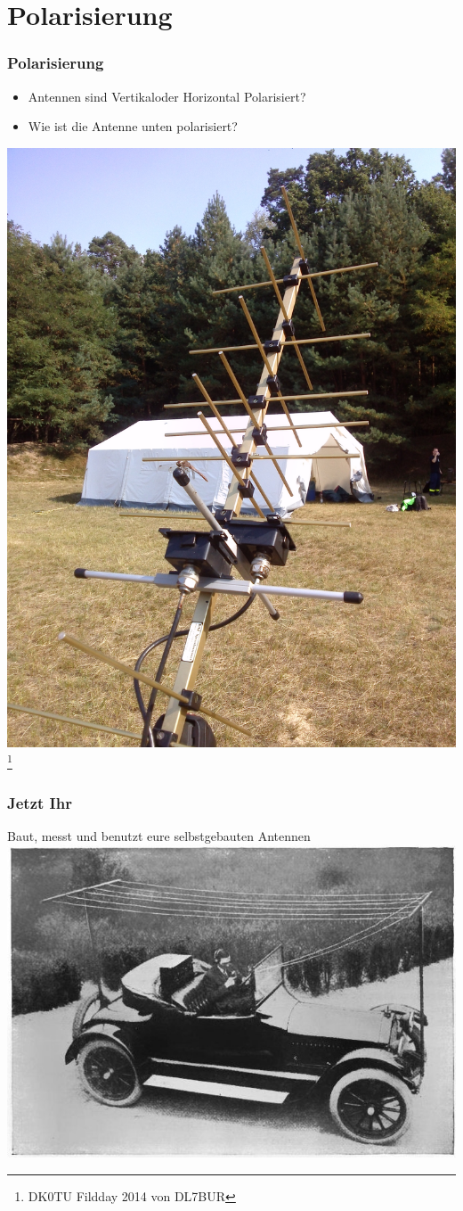 \section*{Polarisierung}

\begin{frame}
    \frametitle{Polarisierung}
    	\begin{itemize}
		\item Antennen sind Vertikaloder Horizontal Polarisiert?
		\item Wie ist die Antenne unten polarisiert?
    \end{itemize}
    \begin{center}
        \includegraphics[width=.4\textwidth]{e11/kreutzYagi.jpg}
        \footnote{\tiny DK0TU Fildday 2014 von DL7BUR}
	\end{center}
\end{frame}

\begin{frame}
    \frametitle{Jetzt Ihr}
    \begin{center} 	Baut, messt und benutzt eure selbstgebauten Antennen
        \includegraphics[width=1\textwidth]{e11/hamPro.jpg}
	\end{center}
\end{frame}

